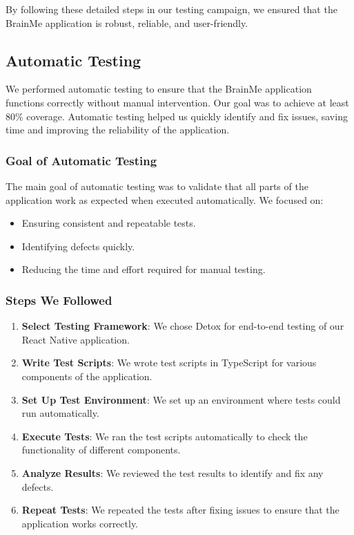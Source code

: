 By following these detailed steps in our testing campaign, we ensured that the BrainMe application is robust, reliable, and user-friendly.

\subsection{Automatic Testing}

We performed automatic testing to ensure that the BrainMe application functions correctly without manual intervention. Our goal was to achieve at least 80\% coverage. Automatic testing helped us quickly identify and fix issues, saving time and improving the reliability of the application.

\subsubsection{Goal of Automatic Testing}

The main goal of automatic testing was to validate that all parts of the application work as expected when executed automatically. We focused on:
\begin{itemize}
    \item Ensuring consistent and repeatable tests.
    \item Identifying defects quickly.
    \item Reducing the time and effort required for manual testing.
\end{itemize}

\subsubsection{Steps We Followed}

\begin{enumerate}
    \item \textbf{Select Testing Framework}: We chose Detox for end-to-end testing of our React Native application.
    \item \textbf{Write Test Scripts}: We wrote test scripts in TypeScript for various components of the application.
    \item \textbf{Set Up Test Environment}: We set up an environment where tests could run automatically.
    \item \textbf{Execute Tests}: We ran the test scripts automatically to check the functionality of different components.
    \item \textbf{Analyze Results}: We reviewed the test results to identify and fix any defects.
    \item \textbf{Repeat Tests}: We repeated the tests after fixing issues to ensure that the application works correctly.
\end{enumerate}

